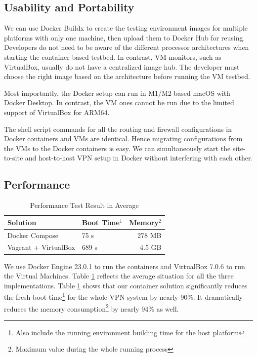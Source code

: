 \documentclass[article]{aaltoseries}
\begin{document}
\subsection{Usability and Portability}
We can use Docker Buildx \cite{dockermultiplatform} to create the testing environment images for multiple platforms with only one machine, then upload them to Docker Hub for reusing. Developers do not need to be aware of the different processor architectures when starting the container-based testbed. In contrast, VM monitors, such as VirtualBox, usually do not have a centralized image hub. The developer must choose the right image based on the architecture before running the VM testbed.

Most importantly, the Docker setup can run in M1/M2-based macOS with Docker Desktop. In contrast, the VM ones cannot be run due to the limited support of VirtualBox for ARM64.

The shell script commands for all the routing and firewall configurations in Docker containers and VMs are identical. Hence migrating configurations from the VMs to the Docker containers is easy. We can simultaneously start the site-to-site and host-to-host VPN setup in Docker without interfering with each other.

\subsection{Performance}
\begin{table}[t!]
  \begin{center}
    \begin{tabular}{|l|lr|}
    \hline
    Solution               & Boot Time$^1$ & Memory$^2$ \\
    \hline
    Docker Compose         &   75 s    &  278 MB \\
    Vagrant + VirtualBox   &  689 s    &  4.5 GB \\
    \hline
    \end{tabular}
    \caption{Performance Test Result in Average}
    \label{tab:result}
  \end{center}
\end{table}

We use Docker Engine 23.0.1 to run the containers and VirtualBox 7.0.6 to run the Virtual Machines. Table \ref{tab:result} reflects the average situation for all the three implementations. Table \ref{tab:result} shows that our container solution significantly reduces the fresh boot time\footnote{Also include the running environment building time for the host platform} for the whole VPN system by nearly 90\%. It dramatically reduces the memory consumption\footnote{Maximum value during the whole running process} by nearly 94\% as well.
\end{document}
